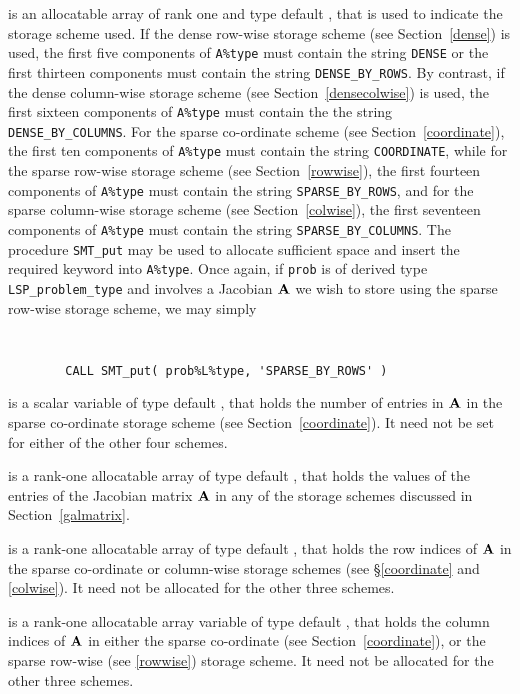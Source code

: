 \documentclass{galahad}
\newcommand{\packagename}{LSP}
\begin{document}
\begin{description}
\begin{description}
 is an allocatable array of rank one and type default \character, 
that is used to indicate the storage scheme used. If the dense row-wise 
storage scheme (see Section~\ref{dense}) is used, 
the first five components of {\tt A\%type} must contain the
string {\tt DENSE} or the first thirteen components must contain the
string {\tt DENSE\_BY\_ROWS}.
By contrast, if the dense column-wise storage scheme 
(see Section~\ref{densecolwise}) is used, 
the first sixteen components of {\tt A\%type} must contain the
the string {\tt DENSE\_BY\_COLUMNS}.
For the sparse co-ordinate scheme (see Section~\ref{coordinate}), 
the first ten components of {\tt A\%type} must contain the
string {\tt COORDINATE}, while 
for the sparse row-wise storage scheme (see Section~\ref{rowwise}),
the first fourteen components of {\tt A\%type} must contain the
string {\tt SPARSE\_BY\_ROWS},
and for the sparse column-wise storage scheme (see Section~\ref{colwise}),
the first seventeen components of {\tt A\%type} must contain the
string {\tt SPARSE\_BY\_COLUMNS}.
The procedure {\tt SMT\_put} may be used to allocate sufficient space and 
insert the required keyword into {\tt A\%type}.
Once again, if {\tt prob} is of derived type {\tt \packagename\_problem\_type}
and involves a Jacobian ${\mathbf{A}}$ we wish to store using the sparse row-wise 
storage scheme, we may simply
{\tt 
\begin{verbatim}
        CALL SMT_put( prob%L%type, 'SPARSE_BY_ROWS' )
\end{verbatim}
}
\noindent

 is a scalar variable of type default \integer, that 
holds the number of entries in ${\mathbf{A}}$
in the sparse co-ordinate storage scheme (see Section~\ref{coordinate}). 
It need not be set for either of the other four schemes.

 is a rank-one allocatable array of type default \realdp, that holds
the values of the entries of the Jacobian matrix ${\mathbf{A}}$ in any of the 
storage schemes discussed in Section~\ref{galmatrix}.

 is a rank-one allocatable array of type default \integer,
that holds the row indices of ${\mathbf{A}}$ in the sparse co-ordinate 
or column-wise storage schemes (see \S\ref{coordinate} and \ref{colwise}).
It need not be allocated for the other three schemes.

 is a rank-one allocatable array variable of type default \integer,
that holds the column indices of ${\mathbf{A}}$ in either the sparse co-ordinate 
(see Section~\ref{coordinate}), or the sparse row-wise 
(see \ref{rowwise}) storage scheme.
It need not be allocated for the other three schemes.


\end{description}
\end{description}
\end{document}
